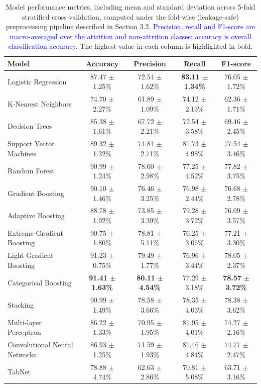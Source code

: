 \documentclass[a4paper,fleqn]{cas-sc}
\begin{document}
\begin{table}[width=1\linewidth,cols=5,pos=H]
\centering
\caption{Model performance metrics, including mean and standard deviation across 5-fold stratified
cross-validation, computed under the fold-wise (leakage-safe) preprocessing pipeline described in
Section 3.2. \textcolor{blue}{Precision, recall and F1-score are macro-averaged over the attrition and non-attrition classes; accuracy is overall classification accuracy.} The highest value in each column is highlighted in bold.}
\label{tab:model_comparison}
\renewcommand{\arraystretch}{1.075} %
\begin{tabular}{lcccc}
\toprule
\textbf{Model} & \textbf{Accuracy} & \textbf{Precision} & \textbf{Recall} & \textbf{F1-score} \\
\midrule
Logistic Regression        & 87.47 $\pm$ 1.25\% & 72.54 $\pm$ 1.62\% & \textbf{83.11 $\pm$ 1.34\%} & 76.05 $\pm$ 1.72\% \\
K-Nearest Neighbors         & 74.70 $\pm$ 2.27\% & 61.89 $\pm$ 1.09\% & 74.12 $\pm$ 2.13\%          & 62.36 $\pm$ 1.71\% \\
Decision Trees              & 85.38 $\pm$ 1.61\% & 67.72 $\pm$ 2.21\% & 72.54 $\pm$ 3.58\%          & 69.46 $\pm$ 2.45\% \\
Support Vector Machines     & 89.32 $\pm$ 1.32\% & 74.84 $\pm$ 2.71\% & 81.73 $\pm$ 4.98\%          & 77.54 $\pm$ 3.46\% \\
Random Forest               & 90.99 $\pm$ 1.24\% & 78.60 $\pm$ 2.98\% & 77.25 $\pm$ 4.52\%          & 77.82 $\pm$ 3.75\% \\
Gradient Boosting           & 90.10 $\pm$ 1.46\% & 76.46 $\pm$ 3.25\% & 76.98 $\pm$ 2.44\%          & 76.68 $\pm$ 2.78\% \\
Adaptive Boosting           & 88.78 $\pm$ 1.92\% & 73.85 $\pm$ 3.39\% & 79.28 $\pm$ 3.72\%          & 76.09 $\pm$ 3.57\% \\
Extreme Gradient Boosting   & 90.75 $\pm$ 1.80\% & 78.81 $\pm$ 5.11\% & 76.25 $\pm$ 3.06\%          & 77.21 $\pm$ 3.30\% \\
Light Gradient Boosting     & 91.23 $\pm$ 0.75\% & 79.49 $\pm$ 1.77\% & 76.96 $\pm$ 3.44\%          & 78.05 $\pm$ 2.37\% \\
Categorical Boosting        & \textbf{91.41 $\pm$ 1.63\%} & \textbf{80.11 $\pm$ 4.54\%} & 77.29 $\pm$ 3.18\% & \textbf{78.57 $\pm$ 3.72\%} \\
Stacking                    & 90.99 $\pm$ 1.49\% & 78.58 $\pm$ 3.66\% & 78.35 $\pm$ 4.03\%          & 78.38 $\pm$ 3.62\% \\
Multi-layer Perceptron      & 86.22 $\pm$ 1.33\% & 70.95 $\pm$ 1.95\% & 81.95 $\pm$ 4.01\%          & 74.27 $\pm$ 2.16\% \\
Convolutional Neural Networks & 86.93 $\pm$ 1.25\% & 71.59 $\pm$ 1.93\% & 81.46 $\pm$ 4.84\%        & 74.77 $\pm$ 2.47\% \\
TabNet                      & 78.88 $\pm$ 4.74\% & 62.63 $\pm$ 2.86\% & 70.81 $\pm$ 5.08\%          & 63.71 $\pm$ 3.16\% \\
\bottomrule
\end{tabular}
\end{table}
\end{document}
